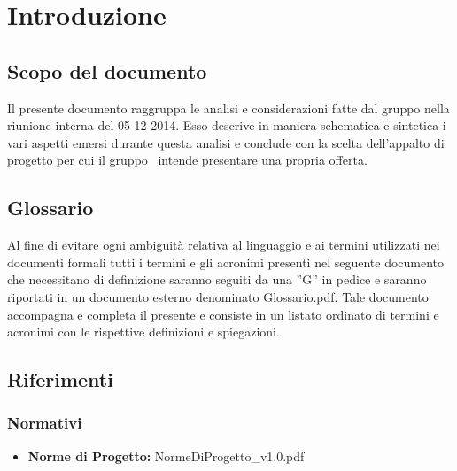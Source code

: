 \section{Introduzione}
\subsection{Scopo del documento}
Il presente documento raggruppa le analisi e considerazioni fatte dal gruppo nella
riunione interna del 05-12-2014. Esso descrive in maniera schematica e sintetica i
vari aspetti emersi durante questa analisi e conclude con la scelta dell'appalto di
progetto per cui il gruppo \gruppo\ intende presentare una propria offerta. 

\subsection{Glossario}

Al fine di evitare ogni ambiguità relativa al linguaggio e ai termini utilizzati nei documenti formali tutti i termini e gli acronimi presenti nel seguente documento che necessitano di definizione saranno seguiti da una ”G” in pedice e saranno riportati in un documento esterno denominato Glossario.pdf. Tale documento accompagna e completa il presente e consiste in un listato ordinato di termini e acronimi con le rispettive definizioni e spiegazioni.

\subsection{Riferimenti}
\subsubsection{Normativi}
\begin{itemize}
	\item \textbf{Norme di Progetto:} NormeDiProgetto\_v1.0.pdf
\end{itemize}
